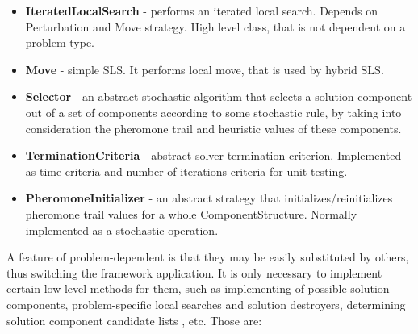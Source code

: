 \documentclass[12pt,a4paper,oneside]{book}
\begin{document}
\begin{itemize}
\item \textbf{IteratedLocalSearch} - performs an iterated local search. Depends on Perturbation and Move strategy. High level class, that is not dependent on a problem type.

\item \textbf{Move} - simple SLS. It performs local move, that is used by hybrid SLS.

\item \textbf{Selector} - an abstract stochastic algorithm that selects a solution component out of a set of components according to some stochastic rule, by taking into consideration the pheromone trail and heuristic values of these components.

\item \textbf{TerminationCriteria} - abstract solver termination criterion. Implemented as time criteria and number of iterations criteria for unit testing.

\item \textbf{PheromoneInitializer} - an abstract strategy that initializes/reinitializes pheromone trail values for a whole ComponentStructure. Normally implemented as a stochastic operation.

\end{itemize}

A feature of problem-dependent is that they may be easily substituted by others, thus switching the framework application. It is only necessary to implement certain low-level methods for them, such as implementing of possible solution components, problem-specific local searches and solution destroyers, determining solution component candidate lists , etc. Those are:
\end{document}
